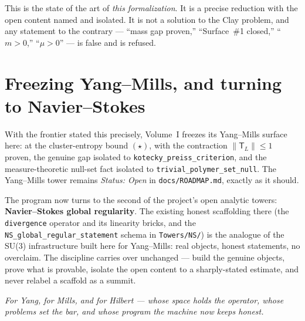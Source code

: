 \documentclass[11pt]{article}
\newcommand{\TL}{\mathsf{T}_L}
\newcommand{\code}[1]{\texttt{#1}}
\begin{document}
\noindent This is the state of the art of \emph{this formalization}.
It is a precise reduction with the open content named and isolated.
It is not a solution to the Clay problem, and any statement to the
contrary --- ``mass gap proven,'' ``Surface~\#1 closed,'' ``$m>0$,''
``$\mu>0$'' --- is false and is refused.

\section{Freezing Yang--Mills, and turning to Navier--Stokes}

With the frontier stated this precisely, Volume~I freezes its
Yang--Mills surface here: at the cluster-entropy bound $(\star)$,
with the contraction $\lVert\TL\rVert\le 1$ proven, the genuine gap
isolated to \code{kotecky\_preiss\_criterion}, and the measure-theoretic
null-set fact isolated to \code{trivial\_polymer\_set\_null}. The
Yang--Mills tower remains \emph{Status: Open} in
\code{docs/ROADMAP.md}, exactly as it should.

The program now turns to the second of the project's open analytic
towers: \textbf{Navier--Stokes global regularity}. The existing
honest scaffolding there (the \code{divergence} operator and its
linearity bricks, and the \code{NS\_global\_regular\_statement}
schema in \code{Towers/NS/}) is the analogue of the SU(3)
infrastructure built here for Yang--Mills: real objects, honest
statements, no overclaim. The discipline carries over unchanged ---
build the genuine objects, prove what is provable, isolate the open
content to a sharply-stated estimate, and never relabel a scaffold as
a summit.

\bigskip
\noindent\emph{For Yang, for Mills, and for Hilbert --- whose space
holds the operator, whose problems set the bar, and whose program
the machine now keeps honest.}
\end{document}
